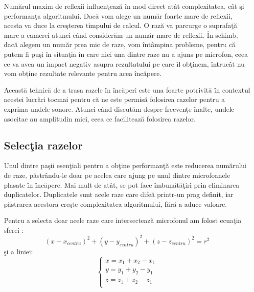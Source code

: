 	Num\u{a}rul maxim de reflexii influen\c{t}eaz\u{a} \^{i}n mod direct at\^{a}t complexitatea, c\^{a}t \c{s}i performan\c{t}a algoritmului. Dac\u{a} vom alege un num\u{a}r foarte mare de reflexii, acesta va duce la cre\c{s}terea timpului de calcul. O raz\u{a} va parcurge o suprafa\c{t}\u{a} mare a camerei atunci c\^{a}nd consider\u{a}m un num\u{a}r mare de reflexii. \^{I}n schimb, dac\u{a} alegem un num\u{a}r prea mic de raze, vom \^{i}nt\^{a}mpina probleme, pentru c\u{a} putem fi pu\c{s}i \^{i}n situa\c{t}ia \^{i}n care nici una dintre raze nu a ajuns pe microfon, ceea ce va avea un impact negativ asupra rezultatului pe care \^{i}l ob\c{t}inem, întrucât nu vom obține rezultate relevante pentru acea încăpere. 
	
	Această tehnică de a trasa razele în încăperi este una foarte potrivită în contextul acestei lucrări tocmai pentru că ne este permisă folosirea razelor pentru a exprima undele sonore. Atunci când discutăm despre frecvențe înalte, undele asocitae au amplitudin mici, ceea ce facilitează folosirea razelor.
	

\subsection{Selec\c{t}ia razelor}

	Unul dintre pa\c{s}ii esen\c{t}iali pentru a ob\c{t}ine performan\c{t}\u{a} este reducerea num\u{a}rului de raze, p\u{a}str\^{a}ndu-le doar pe acelea care ajung pe unul dintre microfoanele plasate \^{i}n \^{i}nc\u{a}pere. Mai mult de at\^{a}t, se pot face \^{i}mbun\u{a}t\u{a}\c{t}iri prin eliminarea duplicatelor. Duplicatele sunt acele raze care dife\u{a} printr-un prag definit, iar p\u{a}strarea acestora cre\c{s}te complexitatea algoritmului, f\u{a}r\u{a} a aduce valoare.
	 
	
	Pentru a selecta doar acele raze care intersecteaz\u{a} microfonul am folost ecua\c{t}ia sferei \cite{intersectie}:
	\begin{equation}
		(x-x_{centru})^2 + (y-y_{centru})^2 + (z-z_{centru})^2 = r^2
	\end{equation}
	\c{s}i a liniei: 
	\begin{equation}
		\begin{cases}
			x = x_1 + x_2 - x_1\\
			y = y_1 + y_2 - y_1\\
			z = z_1 + z_2 - z_1\\
		\end{cases}
	\end{equation}
	 
